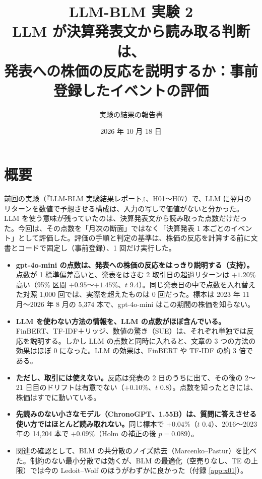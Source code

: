 \documentclass[xelatex,ja=standard,jafont=haranoaji,a4paper,10pt,openany]{bxjsreport}
\title{LLM-BLM 実験 2\\[6pt]
  \large LLM が決算発表文から読み取る判断は、\\発表への株価の反応を説明するか：事前登録したイベントの評価}
\author{実験の結果の報告書}
\date{2026 年 10 月 18 日}
\begin{document}
\maketitle

\chapter*{概要}

前回の実験（『LLM-BLM 実験結果レポート』、H01〜H07）で、LLM に翌月のリターンを数値で予想させる構成は、入力の写しで価値がないと分かった。LLM を使う意味が残っていたのは、決算発表文から読み取った点数だけだった。今回は、その点数を「月次の断面」ではなく「決算発表 1 本ごとのイベント」として評価した。評価の手順と判定の基準は、株価の反応を計算する前に文書とコードで固定し（事前登録）、1 回だけ実行した。

\begin{keybox}[主な結論]
\begin{itemize}
\item \textbf{gpt-4o-mini の点数は、発表への株価の反応をはっきり説明する（支持）。}点数が 1 標準偏差高いと、発表をはさむ 2 取引日の超過リターンは $+1.20\%$ 高い（95\% 区間 $+0.95$〜$+1.45\%$、$t$ 9.4）。同じ発表日の中で点数を入れ替えた対照 1,000 回では、実際を超えたものは 0 回だった。標本は 2023 年 11 月〜2026 年 8 月の 5,374 本で、gpt-4o-mini はこの期間の株価を知らない。
\item \textbf{LLM を使わない方法の情報を、LLM の点数がほぼ含んでいる。}FinBERT、TF-IDF＋リッジ、数値の驚き（SUE）は、それぞれ単独では反応を説明する。しかし LLM の点数と同時に入れると、文章の 3 つの方法の効果はほぼ 0 になった。LLM の効果は、FinBERT や TF-IDF の約 3 倍である。
\item \textbf{ただし、取引には使えない。}反応は発表の 2 日のうちに出て、その後の 2〜21 日目のドリフトは有意でない（$+0.10\%$、$t$ 0.8）。点数を知ったときには、株価はすでに動いている。
\item \textbf{先読みのない小さなモデル（ChronoGPT、1.55B）は、質問に答えさせる使い方ではほとんど読み取れない。}同じ標本で $+0.04\%$（$t$ 0.4）、2016〜2023 年の 14,204 本で $+0.09\%$（Holm の補正の後 $p=0.089$）。
\item 関連の確認として、BLM の共分散のノイズ除去（Marcenko--Pastur）を比べた。制約のない最小分散では効くが、BLM の最適化（空売りなし、TE の上限）では今の Ledoit--Wolf のほうがわずかに良かった（付録 \ref{app:x01}）。
\end{itemize}
\end{keybox}
\end{document}
